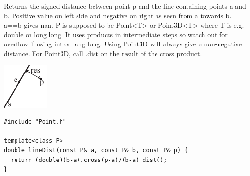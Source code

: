 \begin{minipage}{75mm}
Returns the signed distance between point p and the line containing points a and b. Positive value on left side and negative on right as seen from a towards b. a==b gives nan. P is supposed to be Point<T> or Point3D<T> where T is e.g. double or long long. It uses products in intermediate steps so watch out for overflow if using int or long long. Using Point3D will always give a non-negative distance. For Point3D, call .dist on the result of the cross product.
\end{minipage}
\begin{minipage}{15mm}
\includegraphics[width=\textwidth]{"../code/Geometry/2D Primitive/lineDistance"}
\end{minipage}
\begin{verbatim}
#include "Point.h"

template<class P>
double lineDist(const P& a, const P& b, const P& p) {
  return (double)(b-a).cross(p-a)/(b-a).dist();
}
\end{verbatim}